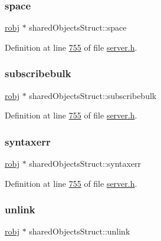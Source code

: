 \subsubsection{\texorpdfstring{space}{space}}
{\footnotesize\ttfamily \hyperlink{structredisObject}{robj} $\ast$ shared\+Objects\+Struct\+::space}



Definition at line \hyperlink{server_8h_source_l00755}{755} of file \hyperlink{server_8h_source}{server.\+h}.

\mbox{\label{structsharedObjectsStruct_a1f0719486e1adc07310d1eeb6be25adf}} 
\subsubsection{\texorpdfstring{subscribebulk}{subscribebulk}}
{\footnotesize\ttfamily \hyperlink{structredisObject}{robj} $\ast$ shared\+Objects\+Struct\+::subscribebulk}



Definition at line \hyperlink{server_8h_source_l00755}{755} of file \hyperlink{server_8h_source}{server.\+h}.

\mbox{\label{structsharedObjectsStruct_ac8b57cb08eb615b15c1a76a076fea21e}} 
\subsubsection{\texorpdfstring{syntaxerr}{syntaxerr}}
{\footnotesize\ttfamily \hyperlink{structredisObject}{robj} $\ast$ shared\+Objects\+Struct\+::syntaxerr}



Definition at line \hyperlink{server_8h_source_l00755}{755} of file \hyperlink{server_8h_source}{server.\+h}.

\mbox{\label{structsharedObjectsStruct_a0a0f23daf1f305065a28094b38ba2866}} 
\subsubsection{\texorpdfstring{unlink}{unlink}}
{\footnotesize\ttfamily \hyperlink{structredisObject}{robj} $\ast$ shared\+Objects\+Struct\+::unlink}



